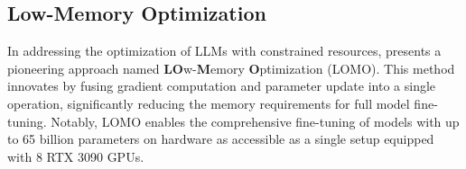     
    \subsection{Low-Memory Optimization}

        In addressing the optimization of LLMs with constrained resources, \cite{lv2023parameter} presents a pioneering approach named \textbf{LO}w-\textbf{M}emory \textbf{O}ptimization (LOMO). This method innovates by fusing gradient computation and parameter update into a single operation, significantly reducing the memory requirements for full model fine-tuning. Notably, LOMO enables the comprehensive fine-tuning of models with up to 65 billion parameters on hardware as accessible as a single setup equipped with 8 RTX 3090 GPUs.

